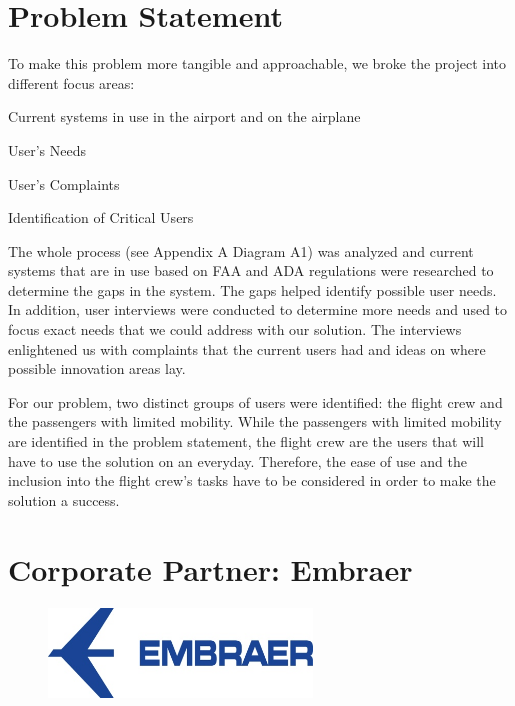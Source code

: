 
\section{Problem Statement}
To make this problem more tangible and approachable, we broke the project into different focus areas:

\begin{list}{-}{}
  \item Current systems in use in the airport and on the airplane
  \item User's Needs
  \item User's Complaints
  \item Identification of Critical Users
\end{list}

The whole process (see Appendix A Diagram A1) was analyzed and current systems that are in use based on FAA and ADA regulations were researched to determine the gaps in the system.  The gaps helped identify possible user needs.  In addition, user interviews were conducted to determine more needs and used to focus exact needs that we could address with our solution.  The interviews enlightened us with complaints that the current users had and ideas on where possible innovation areas lay.

For our problem, two distinct groups of users were identified: the flight crew and the passengers with limited mobility.  While the passengers with limited mobility are identified in the problem statement, the flight crew are the users that will have to use the solution on an everyday.  Therefore, the ease of use and the inclusion into the flight crew's tasks have to be considered in order to make the solution a success.

\section{Corporate Partner: Embraer}

\begin{figure}[h]
  \centering
     \includegraphics[width=7cm]{images/image010.jpg}
  \label{fig:10}
\end{figure}

